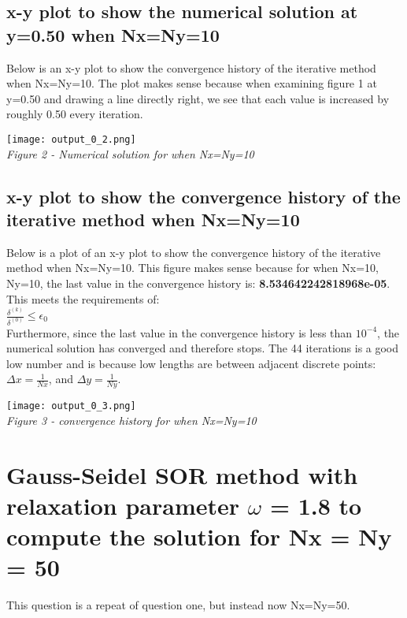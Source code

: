 \documentclass[a4paper, twoside]{article}
\begin{document}
\newpage
\subsection{x-y plot to show the numerical solution at y=0.50 when Nx=Ny=10}
Below is an x-y plot to show the convergence history of the iterative method when Nx=Ny=10. The plot makes sense because when examining figure 1 at y=0.50 and drawing a line directly right, we see that each value is increased by roughly 0.50 every iteration.  \\

\begin{center}
    \texttt{[image: output\_0\_2.png]} \\
    \textit{Figure 2 - Numerical solution for when Nx=Ny=10}
\end{center}

\newpage
\subsection{x-y plot to show the convergence history of the iterative method when Nx=Ny=10}
Below is a plot of an x-y plot to show the convergence history of the iterative method when Nx=Ny=10. This figure makes sense because for when Nx=10, Ny=10, the last value in the convergence history is: \textbf{8.534642242818968e-05}. This meets the requirements of: \\

$\frac{\delta^{(k)}}{\delta^{(0)}} \leq \epsilon_0 $ \\

Furthermore, since the last value in the convergence history is less than $10^{-4}$, the numerical solution has converged and therefore stops. The 44 iterations is a good low number and is because low lengths are between adjacent discrete points: $\Delta x = \frac{1}{Nx}$, and $\Delta y = \frac{1}{Ny}$. 

\begin{center}
    \texttt{[image: output\_0\_3.png]} \\
    \textit{Figure 3 - convergence history for when Nx=Ny=10}
\end{center}

\newpage
\section{Gauss-Seidel SOR method with relaxation parameter $\omega$ = 1.8 to
compute the solution for Nx = Ny = 50}
This question is a repeat of question one, but instead now Nx=Ny=50.
\end{document}
